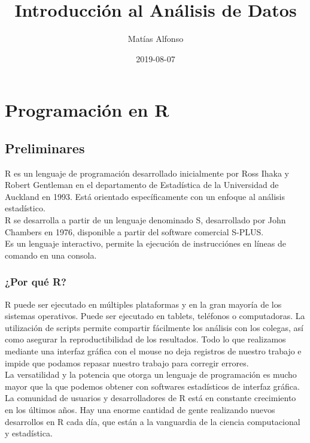 \documentclass[spanish,]{book}
\title{Introducción al Análisis de Datos}
\author{Matías Alfonso}
\date{2019-08-07}
\begin{document}
\maketitle

{
\setcounter{tocdepth}{1}
\tableofcontents
}
\part{Programación en R}\label{part-programacion-en-r}

\chapter{Preliminares}\label{prelim}

R es un lenguaje de programación desarrollado inicialmente por Ross
Ihaka y Robert Gentleman en el departamento de Estadística de la
Universidad de Auckland en 1993. Está orientado específicamente con un
enfoque al análisis estadístico.\\
R se desarrolla a partir de un lenguaje denominado S, desarrollado por
John Chambers en 1976, disponible a partir del software comercial
S-PLUS.\\
Es un lenguaje interactivo, permite la ejecución de instrucciónes en
líneas de comando en una consola.

\section{¿Por qué R?}\label{por-que-r}

R puede ser ejecutado en múltiples plataformas y en la gran mayoría de
los sistemas operativos. Puede ser ejecutado en tablets, teléfonos o
computadoras. La utilización de scripts permite compartir fácilmente los
análisis con los colegas, así como asegurar la reproductibilidad de los
resultados. Todo lo que realizamos mediante una interfaz gráfica con el
mouse no deja registros de nuestro trabajo e impide que podamos repasar
nuestro trabajo para corregir errores.\\
La versatilidad y la potencia que otorga un lenguaje de programación es
mucho mayor que la que podemos obtener con softwares estadísticos de
interfaz gráfica.\\
La comunidad de usuarios y desarrolladores de R está en constante
crecimiento en los últimos años. Hay una enorme cantidad de gente
realizando nuevos desarrollos en R cada día, que están a la vanguardia
de la ciencia computacional y estadística.
\end{document}
